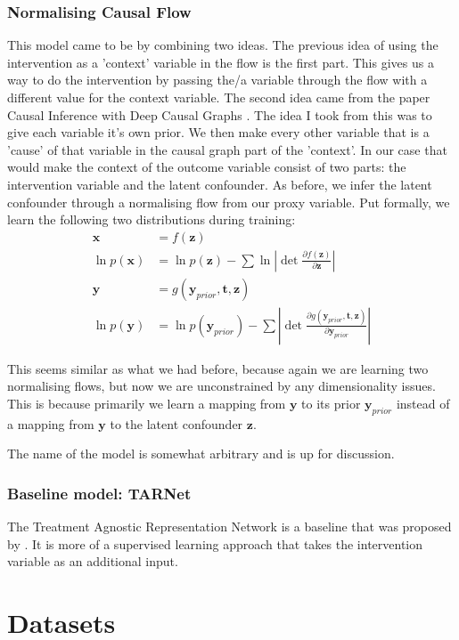 \documentclass{article}
\newcommand{\bt}{\mathbf{t}}
\newcommand{\bx}{\mathbf{x}}
\newcommand{\by}{\mathbf{y}}
\newcommand{\bz}{\mathbf{z}}
\newcommand{\parfrac}[2]{\frac{\partial #1}{\partial#2}}
\begin{document}
\subsubsection{Normalising Causal Flow}
This model came to be by combining two ideas. The previous idea of using the intervention as a 'context' variable in the flow is the first part. This gives us a way to do the intervention by passing the/a variable through the flow with a different value for the context variable. The second idea came from the paper Causal Inference with Deep Causal Graphs \cite{parafita2020causal}. The idea I took from this was to give each variable it's own prior. We then make every other variable that is a 'cause' of that variable in the causal graph part of the 'context'. In our case that would make the context of the outcome variable consist of two parts: the intervention variable and the latent confounder. As before, we infer the latent confounder through a normalising flow from our proxy variable. Put formally, we learn the following two distributions during training:
\begin{align}
    \bx &= f(\bz) \\
    \ln p(\bx) &= \ln p(\bz) - \sum \ln |\det \parfrac{f(\bz)}{\bz}| \\
    \by &= g(\by_{prior}, \bt, \bz)\\
    \ln p(\by) &= \ln p(\by_{prior}) - \sum |\det \parfrac{g(\by_{prior}, \bt, \bz)}{\by_{prior}}|
\end{align}

This seems similar as what we had before, because again we are learning two normalising flows, but now we are unconstrained by any dimensionality issues. This is because primarily we learn a mapping from $\by$ to its prior $\by_{prior}$ instead of a mapping from $\by$ to the latent confounder $\bz$.

The name of the model is somewhat arbitrary and is up for discussion.

\subsubsection{Baseline model: TARNet}
The Treatment Agnostic Representation Network is a baseline that was proposed by \cite{shalit2017estimating}. It is more of a supervised learning approach that takes the intervention variable as an additional input.

\section*{Datasets}
\end{document}

